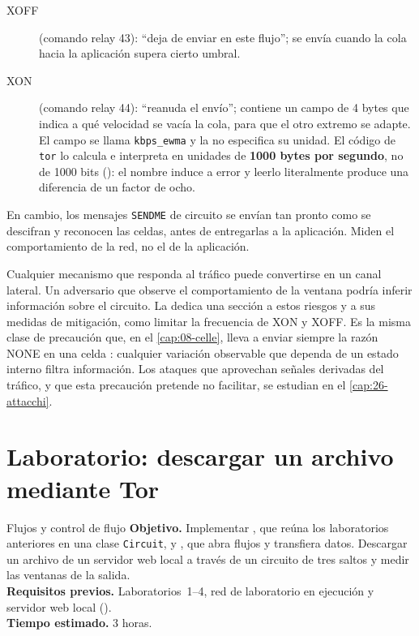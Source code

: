 \begin{description}
  \item[XOFF] (comando relay 43): \enquote{deja de enviar en este flujo}; se envía cuando la cola hacia la aplicación supera cierto umbral.
  \item[XON] (comando relay 44): \enquote{reanuda el envío}; contiene un campo de 4 bytes que indica a qué velocidad se vacía la cola, para que el otro extremo se adapte. El campo se llama \texttt{kbps\_ewma} y la  no especifica su unidad. El código de \texttt{tor} lo calcula e interpreta en unidades de \textbf{1000 bytes por segundo}, no de 1000 bits (): el nombre induce a error y leerlo literalmente produce una diferencia de un factor de ocho.
\end{description}

En cambio, los mensajes \texttt{SENDME} de circuito se envían tan pronto como se descifran y reconocen las celdas, antes de entregarlas a la aplicación. Miden el comportamiento de la red, no el de la aplicación.

\begin{attenzione}
Cualquier mecanismo que responda al tráfico puede convertirse en un canal lateral. Un adversario que observe el comportamiento de la ventana podría inferir información sobre el circuito. La  dedica una sección a estos riesgos y a sus medidas de mitigación, como limitar la frecuencia de XON y XOFF. Es la misma clase de precaución que, en el \cref{cap:08-celle}, lleva a enviar siempre la razón NONE en una celda : cualquier variación observable que dependa de un estado interno filtra información. Los ataques que aprovechan señales derivadas del tráfico, y que esta precaución pretende no facilitar, se estudian en el \cref{cap:26-attacchi}.
\end{attenzione}

\section{Laboratorio: descargar un archivo mediante Tor}\label{sec:lab-stream}

\begin{laboratorio}[5]{Flujos y control de flujo}
\textbf{Objetivo.} Implementar , que reúna los laboratorios anteriores en una clase \texttt{Circuit}, y , que abra flujos y transfiera datos. Descargar un archivo de un servidor web local a través de un circuito de tres saltos y medir las ventanas de la salida.\\
\textbf{Requisitos previos.} Laboratorios~1--4, red de laboratorio en ejecución y servidor web local ().\\
\textbf{Tiempo estimado.} 3 horas.
\end{laboratorio}

